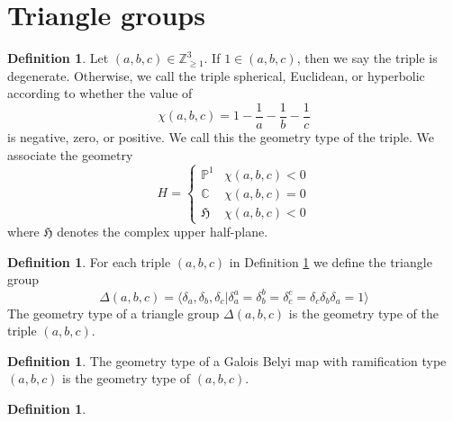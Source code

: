 \documentclass{dcthesis}
\newcommand{\PP}{\mathbb P}
\newcommand{\CC}{\mathbb C}
\newcommand{\ZZ}{\mathbb Z}
\newcommand{\defi}[1]{\textsf{#1}}
\numberwithin{equation}{section}
\theoremstyle{definition}
\newtheorem{definition}[equation]{Definition}
\theoremstyle{remark}
\begin{document}
{  \section{Triangle groups}{\label{sec:trianglegroups}
    \begin{definition}
      \label{def:geometrytype}
      Let $(a,b,c)\in\ZZ_{\geq 1}^3$.
      If $1\in(a,b,c)$, then we say the triple is \defi{degenerate}.
      Otherwise, we call the triple
      \defi{spherical},
      \defi{Euclidean},
      or \defi{hyperbolic}
      according to whether the value of
      \begin{equation}
        \label{eqn:eulerchar}
        \chi(a,b,c) = 1-\frac{1}{a}-\frac{1}{b}-\frac{1}{c}
      \end{equation}
      is negative, zero, or positive.
      We call this the \defi{geometry type}
      of the triple.
      We associate the \defi{geometry}
      \begin{equation}
        \label{eqn:geometrytype}
        H=
        \begin{cases}
          \PP^1&\chi(a,b,c)<0\\
          \CC&\chi(a,b,c)=0\\
          \mathfrak{H}&\chi(a,b,c)<0
        \end{cases}
      \end{equation}
      where $\mathfrak{H}$ denotes the complex upper half-plane.
    \end{definition}
    \begin{definition}
      \label{def:trianglegroup}
      For each triple $(a,b,c)$ in Definition \ref{def:geometrytype}
      we define the \defi{triangle group}
      \begin{equation}
        \label{eqn:trianglegroup}
        \Delta(a,b,c)
        =
        \langle
        \delta_a, \delta_b, \delta_c |
        \delta_a^a=\delta_b^b=\delta_c^c=\delta_c\delta_b\delta_a=1
        \rangle
      \end{equation}
      The \defi{geometry type}
      of a triangle group $\Delta(a,b,c)$
      is the geometry type of the triple $(a,b,c)$.
    \end{definition}
    \begin{definition}\label{def:geometrytypeofbelyimap}
      The \defi{geometry type} of a Galois Belyi map
      with ramification type $(a,b,c)$
      is the geometry type of $(a,b,c)$.
    \end{definition}
    \begin{definition}\label{def:geometrytypeofpermutationtriple}

\end{definition}}}
\end{document}
